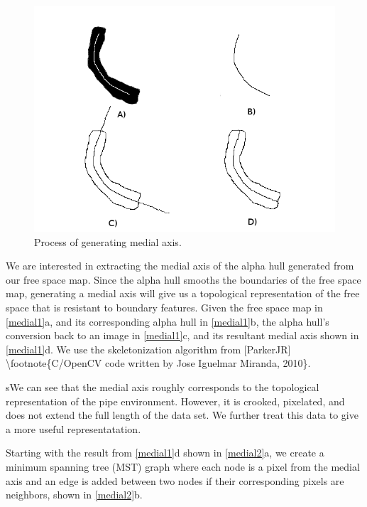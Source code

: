 \begin{figure}[htbp]
\centering
\includegraphics[keepaspectratio,width=400pt,height=0.75\textheight]{4_medial_process2.png}
\caption{Process of generating medial axis.}
\label{medial2}
\end{figure}




We are interested in extracting the medial axis of the alpha hull generated from our free space map. Since the alpha hull smooths the boundaries of the free space map, generating a medial axis will give us a topological representation of the free space that is resistant to boundary features. Given the free space map in \autoref{medial1}a, and its corresponding alpha hull in \autoref{medial1}b, the alpha hull's conversion back to an image in \autoref{medial1}c, and its resultant medial axis shown in \autoref{medial1}d. We use the skeletonization algorithm from [ParkerJR] \textbackslash{}footnote\{C\slash OpenCV code written by Jose Iguelmar Miranda, 2010\}.

sWe can see that the medial axis roughly corresponds to the topological representation of the pipe environment. However, it is crooked, pixelated, and does not extend the full length of the data set. We further treat this data to give a more useful representatation.

Starting with the result from \autoref{medial1}d shown in \autoref{medial2}a, we create a minimum spanning tree (MST) graph where each node is a pixel from the medial axis and an edge is added between two nodes if their corresponding pixels are neighbors, shown in \autoref{medial2}b.

